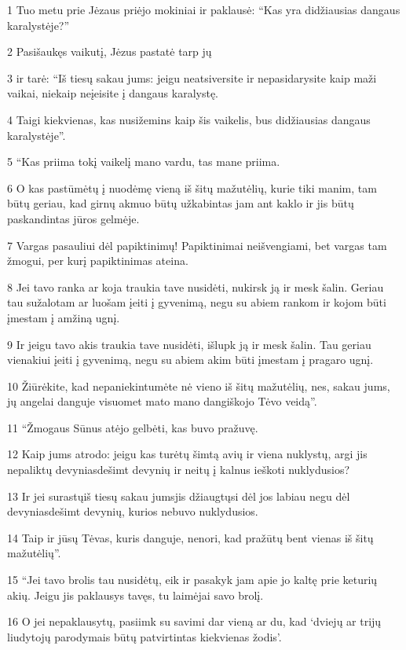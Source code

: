 \par 1 Tuo metu prie Jėzaus priėjo mokiniai ir paklausė: “Kas yra didžiausias dangaus karalystėje?” 
\par 2 Pasišaukęs vaikutį, Jėzus pastatė tarp jų 
\par 3 ir tarė: “Iš tiesų sakau jums: jeigu neatsiversite ir nepasidarysite kaip maži vaikai, niekaip neįeisite į dangaus karalystę. 
\par 4 Taigi kiekvienas, kas nusižemins kaip šis vaikelis, bus didžiausias dangaus karalystėje”. 
\par 5 “Kas priima tokį vaikelį mano vardu, tas mane priima. 
\par 6 O kas pastūmėtų į nuodėmę vieną iš šitų mažutėlių, kurie tiki manim, tam būtų geriau, kad girnų akmuo būtų užkabintas jam ant kaklo ir jis būtų paskandintas jūros gelmėje. 
\par 7 Vargas pasauliui dėl papiktinimų! Papiktinimai neišvengiami, bet vargas tam žmogui, per kurį papiktinimas ateina. 
\par 8 Jei tavo ranka ar koja traukia tave nusidėti, nukirsk ją ir mesk šalin. Geriau tau sužalotam ar luošam įeiti į gyvenimą, negu su abiem rankom ir kojom būti įmestam į amžiną ugnį. 
\par 9 Ir jeigu tavo akis traukia tave nusidėti, išlupk ją ir mesk šalin. Tau geriau vienakiui įeiti į gyvenimą, negu su abiem akim būti įmestam į pragaro ugnį. 
\par 10 Žiūrėkite, kad nepaniekintumėte nė vieno iš šitų mažutėlių, nes, sakau jums, jų angelai danguje visuomet mato mano dangiškojo Tėvo veidą”. 
\par 11 “Žmogaus Sūnus atėjo gelbėti, kas buvo pražuvę. 
\par 12 Kaip jums atrodo: jeigu kas turėtų šimtą avių ir viena nuklystų, argi jis nepaliktų devyniasdešimt devynių ir neitų į kalnus ieškoti nuklydusios? 
\par 13 Ir jei surastų­iš tiesų sakau jums­jis džiaugtųsi dėl jos labiau negu dėl devyniasdešimt devynių, kurios nebuvo nuklydusios. 
\par 14 Taip ir jūsų Tėvas, kuris danguje, nenori, kad pražūtų bent vienas iš šitų mažutėlių”. 
\par 15 “Jei tavo brolis tau nusidėtų, eik ir pasakyk jam apie jo kaltę prie keturių akių. Jeigu jis paklausys tavęs, tu laimėjai savo brolį. 
\par 16 O jei nepaklausytų, pasiimk su savimi dar vieną ar du, kad ‘dviejų ar trijų liudytojų parodymais būtų patvirtintas kiekvienas žodis’. 
